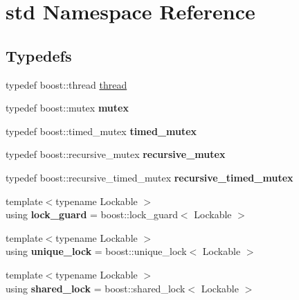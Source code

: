 \hypertarget{namespacestd}{}\section{std Namespace Reference}
\label{namespacestd}
\subsection*{Typedefs}
\begin{DoxyCompactItemize}
\item 
typedef boost\+::thread \hyperlink{namespacestd_af8ef78a9cf464d7f7faf334b0648cd20}{thread}
\item 
typedef boost\+::mutex {\bfseries mutex}\hypertarget{namespacestd_a618c9b161e7909dcd32f45ed5b0d64a8}{}\label{namespacestd_a618c9b161e7909dcd32f45ed5b0d64a8}

\item 
typedef boost\+::timed\+\_\+mutex {\bfseries timed\+\_\+mutex}\hypertarget{namespacestd_a606f872ad6ccc6988d66cd63edd591d4}{}\label{namespacestd_a606f872ad6ccc6988d66cd63edd591d4}

\item 
typedef boost\+::recursive\+\_\+mutex {\bfseries recursive\+\_\+mutex}\hypertarget{namespacestd_a2465f8ca56659ee1d8fad0119f8f1482}{}\label{namespacestd_a2465f8ca56659ee1d8fad0119f8f1482}

\item 
typedef boost\+::recursive\+\_\+timed\+\_\+mutex {\bfseries recursive\+\_\+timed\+\_\+mutex}\hypertarget{namespacestd_acc8e0552c9e703cdbf7e41c8b0ae81ef}{}\label{namespacestd_acc8e0552c9e703cdbf7e41c8b0ae81ef}

\item 
{\footnotesize template$<$typename Lockable $>$ }\\using {\bfseries lock\+\_\+guard} = boost\+::lock\+\_\+guard$<$ Lockable $>$\hypertarget{namespacestd_aa022dc977c3236c7a8b63d344f5e165e}{}\label{namespacestd_aa022dc977c3236c7a8b63d344f5e165e}

\item 
{\footnotesize template$<$typename Lockable $>$ }\\using {\bfseries unique\+\_\+lock} = boost\+::unique\+\_\+lock$<$ Lockable $>$\hypertarget{namespacestd_aa81d6994a02829ac5bd9413e427fe44c}{}\label{namespacestd_aa81d6994a02829ac5bd9413e427fe44c}

\item 
{\footnotesize template$<$typename Lockable $>$ }\\using {\bfseries shared\+\_\+lock} = boost\+::shared\+\_\+lock$<$ Lockable $>$\hypertarget{namespacestd_a774ed93e57639ca1d08e26f22fe71a66}{}\label{namespacestd_a774ed93e57639ca1d08e26f22fe71a66}


\end{DoxyCompactItemize}
